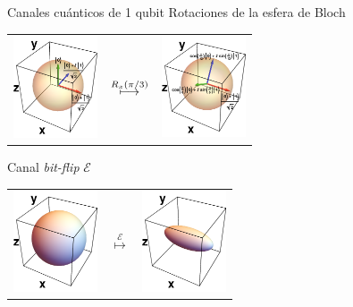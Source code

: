 \documentclass[xcolor=dvipsnames,presentation]{beamer}%
\begin{document}
\begin{frame}{Canales cuánticos de 1 qubit}
	Rotaciones de la esfera de Bloch
	\begin{center}
	\begin{tabular}{m{2.5cm} m{1.8cm} m{2.5cm}}
		\includegraphics[width=2.5cm]{bloch_sphere2}
		& \hspace{\fill} \Large$\overset{\normalsize{R_x(\pi/3)}}{\longmapsto}$ \hspace{\fill}
		& \includegraphics[width=2.5cm]{bloch_sphere_Rx_pi_medios2}
	\end{tabular}
	\end{center}
	
	Canal \textit{bit-flip}	 $\mathcal{E}$
	\begin{center}
	\begin{tabular}{m{2.5cm} m{1.8cm} m{2.5cm}}
		\includegraphics[width=2.5cm]{unit_sph}
		& \hspace{\fill} \Large{$\overset{\mathcal{E}}{\longmapsto}$} \hspace{\fill}
		& \includegraphics[width=2.5cm]{bit_flip_p0_3}
	\end{tabular}
	\end{center}
\end{frame}
\end{document}
